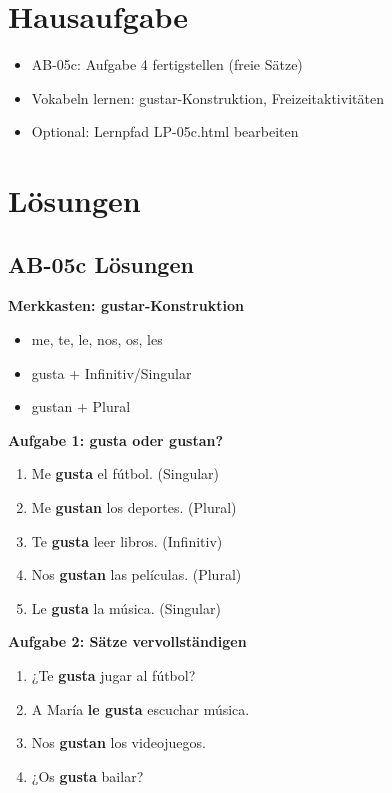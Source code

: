 \documentclass[11pt,a4paper]{article}
\begin{document}
\section{Hausaufgabe}

\begin{itemize}
    \item AB-05c: Aufgabe 4 fertigstellen (freie Sätze)
    \item Vokabeln lernen: gustar-Konstruktion, Freizeitaktivitäten
    \item Optional: Lernpfad LP-05c.html bearbeiten
\end{itemize}

\section{Lösungen}

\subsection{AB-05c Lösungen}

\textbf{Merkkasten: gustar-Konstruktion}
\begin{itemize}
    \item me, te, le, nos, os, les
    \item gusta + Infinitiv/Singular
    \item gustan + Plural
\end{itemize}

\textbf{Aufgabe 1: gusta oder gustan?}
\begin{enumerate}[label=\alph*)]
    \item Me \textbf{gusta} el fútbol. (Singular)
    \item Me \textbf{gustan} los deportes. (Plural)
    \item Te \textbf{gusta} leer libros. (Infinitiv)
    \item Nos \textbf{gustan} las películas. (Plural)
    \item Le \textbf{gusta} la música. (Singular)
\end{enumerate}

\textbf{Aufgabe 2: Sätze vervollständigen}
\begin{enumerate}[label=\alph*)]
    \item ¿Te \textbf{gusta} jugar al fútbol?
    \item A María \textbf{le gusta} escuchar música.
    \item Nos \textbf{gustan} los videojuegos.
    \item ¿Os \textbf{gusta} bailar?
\end{enumerate}
\end{document}
